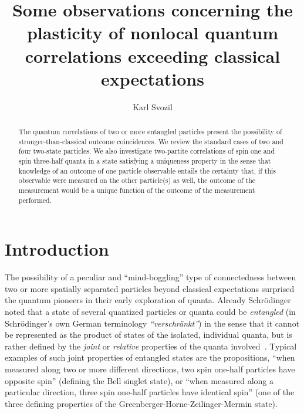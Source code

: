 \documentclass[pra,amsfonts,showpacs,showkeys,preprint]{revtex4}
\begin{document}


\title{Some observations concerning the plasticity of nonlocal quantum correlations exceeding classical expectations}

\author{Karl Svozil}


\begin{abstract}
The quantum correlations of two or more entangled particles present the possibility of stronger-than-classical outcome coincidences. We review the standard cases of two and four two-state particles. We also investigate two-partite correlations of spin one and spin three-half quanta in a state satisfying a uniqueness property in the sense that knowledge of an outcome of one particle observable entails the certainty that, if this observable were measured on the other particle(s) as well, the outcome of the measurement would be a unique function of the outcome of the measurement performed.
\end{abstract}





\maketitle


\section{Introduction}

The possibility of a peculiar and ``mind-boggling'' type of connectedness
between two or more spatially separated particles beyond classical expectations
surprised the quantum pioneers in their early exploration of quanta.
Already Schr\"odinger~\cite{schrodinger}  noted that a state of several quantized particles or quanta
could be {\em entangled} (in Schr\"odinger's own German terminology {\em ``verschr\"ankt''})
in the sense that it cannot be represented as the product of states of the isolated, individual quanta,
but is rather defined by the {\em joint} or {\em relative} properties of the quanta involved~\cite{zeil-99,zeil-Zuk-bruk-01}.
Typical examples of such joint properties of entangled states are the propositions,
``when measured along two or more different directions, two spin one-half particles have opposite spin''
(defining the Bell singlet state),
or ``when measured along a particular direction, three spin one-half particles have identical spin''
(one of the three defining properties of the Greenberger-Horne-Zeilinger-Mermin state).
\end{document}
